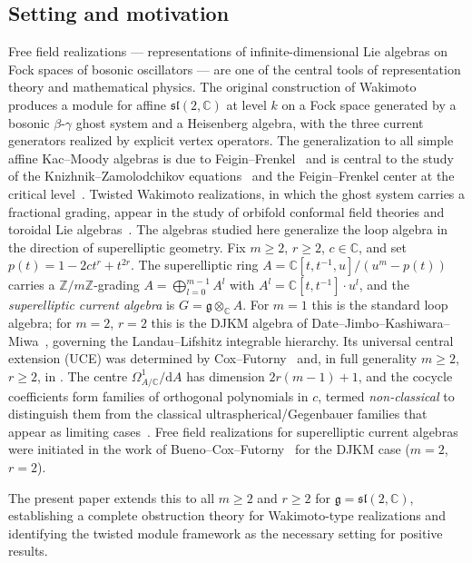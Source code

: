 \documentclass[12pt]{article}
\theoremstyle{plain}
\theoremstyle{definition}
\theoremstyle{remark}
\newcommand{\C}{\mathbb{C}}
\newcommand{\Z}{\mathbb{Z}}
\newcommand{\g}{\mathfrak{g}}
\newcommand{\sltwo}{\mathfrak{sl}(2,\C)}
\begin{document}
\subsection{Setting and motivation}
Free field realizations --- representations of infinite-dimensional Lie algebras
on Fock spaces of bosonic oscillators --- are one of the central tools of
representation theory and mathematical physics.
The original construction of Wakimoto~\cite{Wakimoto} produces a module for
affine $\sltwo$ at level $k$ on a Fock space generated by a bosonic
$\beta$-$\gamma$ ghost system and a Heisenberg algebra, with the three current
generators realized by explicit vertex operators.
The generalization to all simple affine Kac--Moody algebras is due to
Feigin--Frenkel~\cite{FeiginFrenkel} and is central to the study of the
Knizhnik--Zamolodchikov equations~\cite{KZ} and the Feigin--Frenkel center at
the critical level~\cite{FFCenter,Frenkel2005}.
Twisted Wakimoto realizations, in which the ghost system carries a fractional
grading, appear in the study of orbifold conformal field theories and toroidal
Lie algebras~\cite{Beem,BEHHH}.
The algebras studied here generalize the loop algebra in the direction of
superelliptic geometry.
Fix $m\geq 2$, $r\geq 2$, $c\in\C$, and set $p(t)=1-2ct^r+t^{2r}$.
The superelliptic ring $A = \C[t,t^{-1},u]/(u^m-p(t))$ carries a $\Z/m\Z$-grading
$A = \bigoplus_{l=0}^{m-1}A^l$ with $A^l = \C[t,t^{-1}]\cdot u^l$,
and the \emph{superelliptic current algebra} is $G = \g\otimes_\C A$.
For $m=1$ this is the standard loop algebra; for $m=2$, $r=2$ this is the
DJKM algebra of Date--Jimbo--Kashiwara--Miwa~\cite{DJKM}, governing the
Landau--Lifshitz integrable hierarchy.
Its universal central extension (UCE) was determined by
Cox--Futorny~\cite{CoxFutorny-UCE,CoxFutorny-JDE} and, in full generality
$m\geq 2$, $r\geq 2$, in \cite{SNF-II}.
The centre $\Omega^1_{A/\C}/\mathrm{d}A$ has dimension $2r(m-1)+1$, and the
cocycle coefficients form families of orthogonal polynomials in $c$,
termed \emph{non-classical} to distinguish them from the classical
ultraspherical/Gegenbauer families that appear as limiting cases~\cite{CoxFutorny-JDE}.
Free field realizations for superelliptic current algebras were initiated in
the work of Bueno--Cox--Futorny~\cite{BCF09} for the DJKM case
($m=2$, $r=2$).

The present paper extends this to all $m\geq 2$ and $r\geq 2$ for $\g=\sltwo$,
establishing a complete obstruction theory for Wakimoto-type realizations and
identifying the twisted module framework as the necessary setting for positive results.
\end{document}
